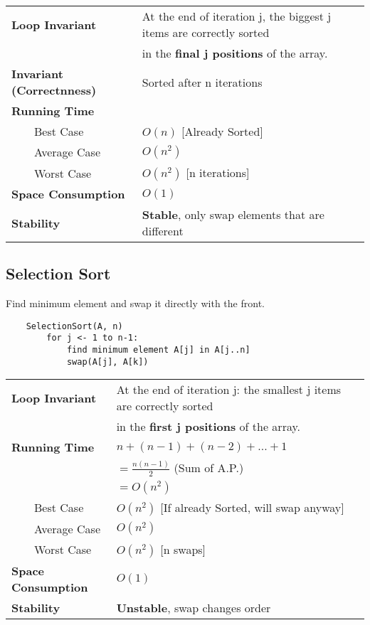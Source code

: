 \documentclass{article}
\newcommand{\tabitem}{~~\llap{\textbullet}~~}
\begin{document}
    \begin{tabular}{ll}
        \toprule
        \textbf{Loop Invariant} & At the end of iteration j, the biggest j items are correctly sorted \\
        & in the \textbf{final j positions} of the array.\\
        \midrule
        \textbf{Invariant (Correctnness)} & Sorted after n iterations\\
        \midrule
        \textbf{Running Time} & \\
        \tabitem Best Case & $O(n)$ [Already Sorted]\\
        \tabitem Average Case & $O(n^{2})$\\
        \tabitem Worst Case & $O(n^{2})$ [n iterations]\\
        \midrule
        \textbf{Space Consumption} & $O(1)$\\
        \midrule
        \textbf{Stability} & \textbf{Stable}, only swap elements that are different\\
        \bottomrule
    \end{tabular}

    \bigskip

    \subsection{Selection Sort}

    Find minimum element and swap it directly with the front.

    \begin{verbatim}
    SelectionSort(A, n)
        for j <- 1 to n-1:
            find minimum element A[j] in A[j..n]
            swap(A[j], A[k])
    \end{verbatim}
    
    \begin{tabular}{ll}
        \toprule
        \textbf{Loop Invariant} & At the end of iteration j: the smallest j items are correctly sorted \\
        & in the \textbf{first j positions} of the array.\\
        \midrule
        \textbf{Running Time} & $n + (n-1) + (n-2) + ... + 1$\\
        & $ = \frac{n(n-1)}{2}$ (Sum of A.P.)\\
        & $ = O(n^{2})$\\
        \tabitem Best Case & $O(n^{2})$ [If already Sorted, will swap anyway]\\
        \tabitem Average Case & $O(n^{2})$\\
        \tabitem Worst Case & $O(n^{2})$ [n swaps]\\
        \midrule
        \textbf{Space Consumption} & $O(1)$\\
        \midrule
        \textbf{Stability} & \textbf{Unstable}, swap changes order\\
        \bottomrule
    \end{tabular}
\end{document}
